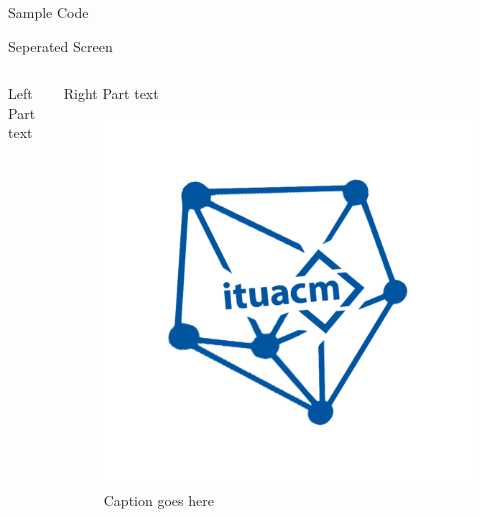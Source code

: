 \documentclass[aspectratio=169]{beamer}%
\begin{document}
\begin{frame}{Sample Code}%

    
\end{frame}%

\begin{frame}{Seperated Screen}%
    \begin{columns}[T] %
        \begin{column}{.64\textwidth}%
             Left Part text
        \end{column}%
        \hfill
        \begin{column}{.32\textwidth}%
            Right Part text
            \begin{figure}[!ht]%
                \centering%
                \includegraphics[width=.7\linewidth]{acm_algo_logo.png}%
                \caption{Caption goes here}%
            \end{figure}%
        \end{column}%
    \end{columns}
\end{frame}
\end{document}
